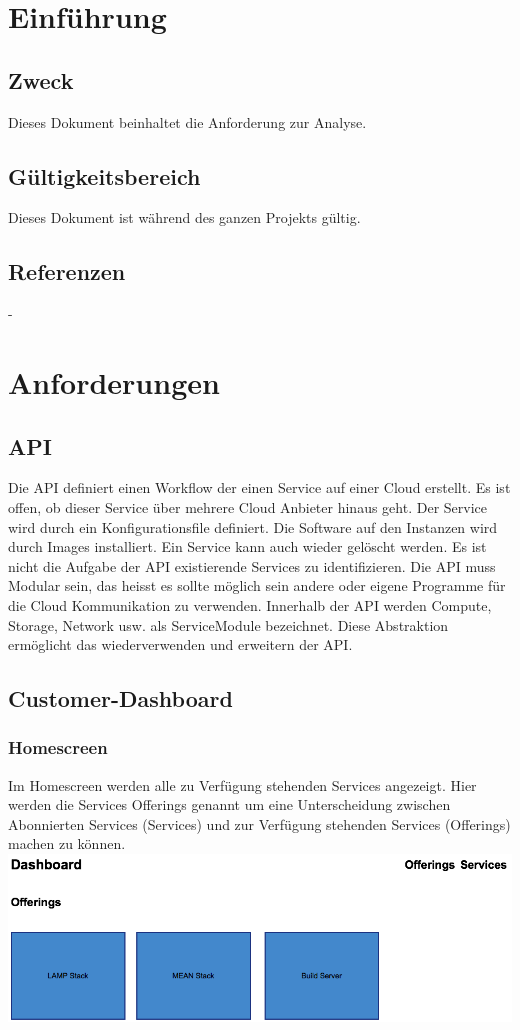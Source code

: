 \documentclass[11pt]{scrartcl}
\begin{document}
\newpage
\tableofcontents
\newpage

\section{Einführung}
\subsection{Zweck}
Dieses Dokument beinhaltet die Anforderung zur Analyse.
\subsection{Gültigkeitsbereich}
Dieses Dokument ist während des ganzen Projekts gültig.


\subsection{Referenzen}
-

\section{Anforderungen}
\subsection{API}
Die API definiert einen Workflow der einen Service auf einer Cloud erstellt. Es ist offen, ob 
dieser Service über mehrere Cloud Anbieter hinaus geht. Der Service wird durch 
ein Konfigurationsfile definiert. Die Software auf den Instanzen wird durch Images installiert.
 Ein Service kann auch wieder gelöscht werden.
 Es ist nicht die Aufgabe der API existierende Services zu identifizieren. 
 Die API muss Modular sein, das heisst es sollte möglich sein andere oder eigene 
 Programme für die Cloud Kommunikation zu verwenden. Innerhalb der API 
 werden Compute, Storage, Network usw. als ServiceModule bezeichnet. 
 Diese Abstraktion ermöglicht das wiederverwenden und erweitern der API.
\newpage
\subsection{Customer-Dashboard}
\subsubsection{Homescreen}
Im Homescreen werden alle zu 
Verfügung stehenden Services angezeigt.
Hier werden die Services Offerings genannt um eine Unterscheidung zwischen 
Abonnierten Services (Services) und zur Verfügung stehenden Services (Offerings) 
machen zu können.
\newline
\includegraphics[width=\textwidth]{homescreen_customer}
\end{document}
